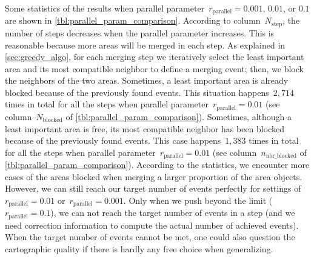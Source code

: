\documentclass[]{interact}
\begin{document}
Some statistics of the results when 
parallel parameter~$r_\mathrm{parallel}=0.001$, $0.01$, or $0.1$ 
are shown in \tabl\ref{tbl:parallel_param_comparison}.
According to column~$N_\mathrm{step}$,
the number of steps decreases 
when the parallel parameter increases.
This is reasonable because more areas will be merged in each step.
As explained in \sect\ref{sec:greedy_algo}, 
for each merging step we iteratively select the least important area 
and its most compatible neighbor to define a merging event; 
then, we block the neighbors of the two areas.
Sometimes, a least important area is already blocked 
because of the previously found events.
This situation happens~$2{,}714$ times in total for all the steps
when parallel parameter~$r_\mathrm{parallel}=0.01$
(see column~$N_\mathrm{blocked}$ of \tabl\ref{tbl:parallel_param_comparison}).
%
Sometimes, although a least important area is free, 
its most compatible neighbor has been blocked 
because of the previously found events.
This case happens~$1{,}383$ times in total for all the steps
when parallel parameter~$r_\mathrm{parallel}=0.01$
(see column~$n_\mathrm{nbr\_blocked}$ of \tabl\ref{tbl:parallel_param_comparison}).
%
According to the statistics, we encounter more cases of the areas blocked
when merging a larger proportion of the area objects.
However, we can still reach our target number of events perfectly 
for settings of~$r_\mathrm{parallel}=0.01$ or~$r_\mathrm{parallel}=0.001$. 
Only when we push beyond the limit (\eg~$r_\mathrm{parallel}=0.1$), 
we can not reach the target number of events in a step 
(and we need correction information 
to compute the actual number of achieved events). 
When the target number of events cannot be met, 
one could also question the cartographic quality 
if there is hardly any free choice when generalizing.
\end{document}
